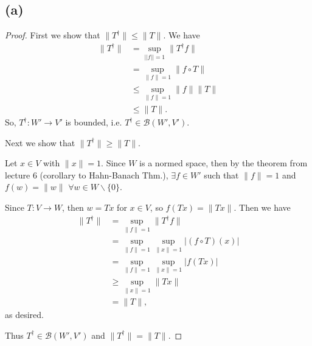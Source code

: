 \documentclass{article}
\begin{document}
\subsection*{(a)}
\begin{proof}
	First we show that $\|T^{\dagger}\| \leq \|T\|$. We have\begin{align}
		\|T^{\dagger}\| &= \sup_{||f||=1}\|T^{\dagger} f\| \\
		&= \sup_{\|f\|=1}\|f\circ T\| \\
		&\leq \sup_{\|f\|=1}\|f\|\|T\| \\
		&\leq \|T\|.
	\end{align}
	So, $T^{\dagger}: W' \rightarrow V'$ is bounded, i.e. $T^{\dagger}\in \mathcal{B}(W', V')$. 
	
	Next we show that $\|T^{\dagger}\| \geq \|T\|$. 
	
	Let $x\in V$ with $\|x\|=1$. Since $W$ is a normed space, then by the theorem from lecture 6 (corollary to Hahn-Banach Thm.), $\exists f \in W'$ such that $\|f\|=1$ and $f(w)=\|w\|$ $\forall w \in W\backslash\{0\}$. 
	
	Since $T: V \rightarrow W$, then $w = Tx$ for $x \in V$, so $f(Tx) = \|Tx\|$. Then we have
	\begin{align}
		\|T^{\dagger}\| &= \sup_{\|f\|=1}\|T^{\dagger}f\| \\
		&= \sup_{\|f\|=1}\sup_{\|x\|=1}|(f\circ T)(x)| \\
		&=\sup_{\|f\|=1}\sup_{\|x\|=1}|f(Tx)| \\
		&\geq \sup_{\|x\|=1}\|Tx\| \\
		&= \|T\|,
	\end{align}
	as desired.
	
	Thus $T^{\dagger}\in\mathcal{B}(W', V')$ and $\|T^{\dagger}\| = \|T\|$.
\end{proof}
\end{document}
